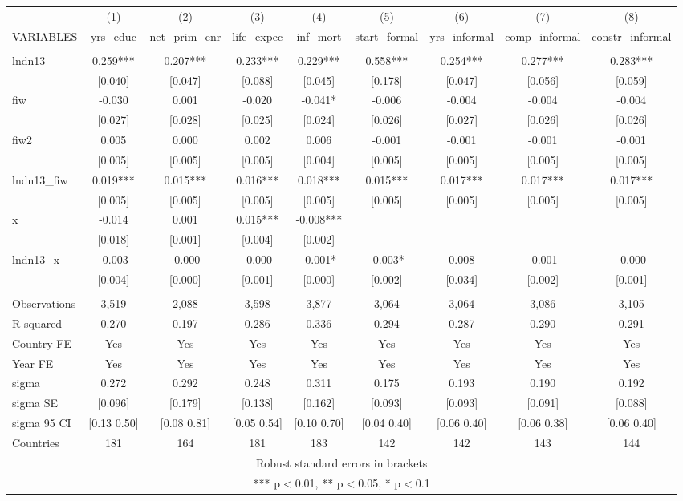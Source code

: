 \begin{tabular}{lcccccccc} \hline
 & (1) & (2) & (3) & (4) & (5) & (6) & (7) & (8) \\
VARIABLES & yrs\_educ & net\_prim\_enr & life\_expec & inf\_mort & start\_formal & yrs\_informal & comp\_informal & constr\_informal \\ \hline
 &  &  &  &  &  &  &  &  \\
lndn13 & 0.259*** & 0.207*** & 0.233*** & 0.229*** & 0.558*** & 0.254*** & 0.277*** & 0.283*** \\
 & [0.040] & [0.047] & [0.088] & [0.045] & [0.178] & [0.047] & [0.056] & [0.059] \\
fiw & -0.030 & 0.001 & -0.020 & -0.041* & -0.006 & -0.004 & -0.004 & -0.004 \\
 & [0.027] & [0.028] & [0.025] & [0.024] & [0.026] & [0.027] & [0.026] & [0.026] \\
fiw2 & 0.005 & 0.000 & 0.002 & 0.006 & -0.001 & -0.001 & -0.001 & -0.001 \\
 & [0.005] & [0.005] & [0.005] & [0.004] & [0.005] & [0.005] & [0.005] & [0.005] \\
lndn13\_fiw & 0.019*** & 0.015*** & 0.016*** & 0.018*** & 0.015*** & 0.017*** & 0.017*** & 0.017*** \\
 & [0.005] & [0.005] & [0.005] & [0.005] & [0.005] & [0.005] & [0.005] & [0.005] \\
x & -0.014 & 0.001 & 0.015*** & -0.008*** &  &  &  &  \\
 & [0.018] & [0.001] & [0.004] & [0.002] &  &  &  &  \\
lndn13\_x & -0.003 & -0.000 & -0.000 & -0.001* & -0.003* & 0.008 & -0.001 & -0.000 \\
 & [0.004] & [0.000] & [0.001] & [0.000] & [0.002] & [0.034] & [0.002] & [0.001] \\
 &  &  &  &  &  &  &  &  \\
Observations & 3,519 & 2,088 & 3,598 & 3,877 & 3,064 & 3,064 & 3,086 & 3,105 \\
R-squared & 0.270 & 0.197 & 0.286 & 0.336 & 0.294 & 0.287 & 0.290 & 0.291 \\
Country FE & Yes & Yes & Yes & Yes & Yes & Yes & Yes & Yes \\
Year FE & Yes & Yes & Yes & Yes & Yes & Yes & Yes & Yes \\
sigma & 0.272 & 0.292 & 0.248 & 0.311 & 0.175 & 0.193 & 0.190 & 0.192 \\
sigma SE & [0.096] & [0.179] & [0.138] & [0.162] & [0.093] & [0.093] & [0.091] & [0.088] \\
sigma 95 CI & [0.13 0.50] & [0.08 0.81] & [0.05 0.54] & [0.10 0.70] & [0.04 0.40] & [0.06 0.40] & [0.06 0.38] & [0.06 0.40] \\
 Countries & 181 & 164 & 181 & 183 & 142 & 142 & 143 & 144 \\ \hline
\multicolumn{9}{c}{ Robust standard errors in brackets} \\
\multicolumn{9}{c}{ *** p$<$0.01, ** p$<$0.05, * p$<$0.1} \\
\end{tabular}
